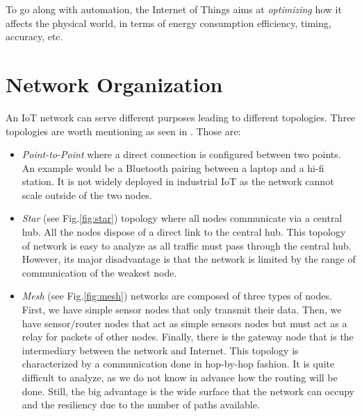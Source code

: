 To go along with automation, the Internet of Things aims at \textit{optimizing} how it affects the physical world, in terms of energy consumption efficiency, timing, accuracy, etc.

\section{Network Organization}

An IoT network can serve different purposes leading to different topologies. Three topologies are worth mentioning as seen in \cite{website:3topo}. Those are:
\begin{itemize}
  \item \textit{Point-to-Point} where a direct connection is configured between two points. An example would be a Bluetooth pairing between a laptop and a hi-fi station. It is not widely deployed in industrial IoT as the network cannot scale outside of the two nodes.
  \item \textit{Star} (see Fig.\ref{fig:star}) topology where all nodes communicate via a central hub. All the nodes dispose of a direct link to the central hub. This topology of network is easy to analyze as all traffic must pass through the central hub. However, its major disadvantage is that the network is limited by the range of communication of the weakest node.
  \item \textit{Mesh} (see Fig.\ref{fig:mesh}) networks are composed of three types of nodes. First, we have simple sensor nodes that only transmit their data. Then, we have sensor/router nodes that act as simple sensors nodes but must act as a relay for packets of other nodes. Finally, there is the gateway node that is the intermediary between the network and Internet. This topology is characterized by a communication done in hop-by-hop fashion. It is quite difficult to analyze, as we do not know in advance how the routing will be done. Still, the big advantage is the wide surface that the network can occupy and the resiliency due to the number of paths available.\\
\end{itemize}

